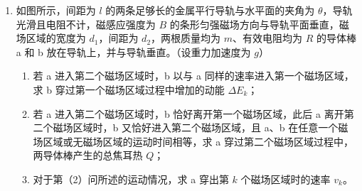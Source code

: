 \documentclass[\gkver]{gaokaozhenti}
\begin{document}
\begin{enumerate}



\item
如图所示，间距为 $l$ 的两条足够长的金属平行导轨与水平面的夹角为 $\theta$，导轨光滑且电阻不计，磁感应强度为 $B$ 的条形匀强磁场方向与导轨平面垂直，磁场区域的宽度为 $d_{1}$，间距为 $d_{2}$，两根质量均为 $m$、有效电阻均为 $R$ 的导体棒 a 和 b 放在导轨上，并与导轨垂直。（设重力加速度为 $g$）

\begin{enumerate}
	\item
	若 a 进入第二个磁场区域时，b 以与 a 同样的速率进入第一个磁场区域，求 b 穿过第一个磁场区域过程中增加的动能 $\Delta E_{k}$；
	
	\item
	若 a 进入第二个磁场区域时，b 恰好离开第一个磁场区域，此后 a 离开第二个磁场区域时，b 又恰好进入第二个磁场区域，且 a、b 在任意一个磁场区域或无磁场区域的运动时间相等，求 a 穿过第二个磁场区域过程中，两导体棒产生的总焦耳热 $Q$；
	
	\item
	对于第（2）问所述的运动情况，求 a 穿出第 $k$ 个磁场区域时的速率 $v_{k}$。
\end{enumerate}


\end{enumerate}
\end{document}
